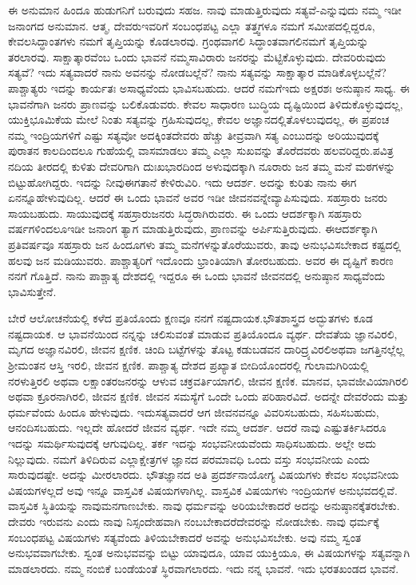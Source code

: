 ಈ ಅನುಮಾನ ಹಿಂದೂ ಹುಡುಗನಿಗೆ ಬರುವುದು ಸಹಜ. ನಾವು ಮಾಡುತ್ತಿರುವುದು ಸತ್ಯವೆ-ಎನ್ನುವುದು ನಮ್ಮ ಇಡೀ ಜನಾಂಗದ ಅನುಮಾನ. ಆತ್ಮ, ದೇವರು\break ಇವರಿಗೆ ಸಂಬಂಧಪಟ್ಟ ಎಲ್ಲಾ ತತ್ತ್ವಗಳೂ ನಮಗೆ ಸಮೀಪದಲ್ಲಿದ್ದರೂ, ಕೇವಲ\break ಸಿದ್ಧಾಂತಗಳು ನಮಗೆ ತೃಪ್ತಿಯನ್ನು ಕೊಡಲಾರವು. ಗ್ರಂಥವಾಗಲಿ ಸಿದ್ಧಾಂತವಾಗಲಿ\break ನಮಗೆ ತೃಪ್ತಿಯನ್ನು ತರಲಾರವು. ಸಾಕ್ಷಾತ್ಕಾರವೆಂಬ ಒಂದು ಭಾವನೆ ನಮ್ಮ\break ಸಾವಿರಾರು ಜನರನ್ನು ಮೆಟ್ಟಿಕೊಳ್ಳುವುದು. ದೇವರಿರುವುದು ಸತ್ಯವೆ? ಇದು ಸತ್ಯವಾದರೆ ನಾನು ಅವನನ್ನು ನೋಡಬಲ್ಲೆನೆ? ನಾನು ಸತ್ಯವನ್ನು ಸಾಕ್ಷಾತ್ಕಾರ ಮಾಡಿಕೊಳ್ಳಬಲ್ಲೆನೆ? ಪಾಶ್ಚಾತ್ಯರು ಇದನ್ನು ಕಾರ್ಯತಃ ಅಸಾಧ್ಯವೆಂದು ಭಾವಿಸಬಹುದು. ಆದರೆ ನಮಗೆ\break ಇದು ಅಕ್ಷರಶಃ ಅನುಷ್ಠಾನ ಸಾಧ್ಯ. ಈ ಭಾವನೆಗಾಗಿ ಜನರು ಪ್ರಾಣವನ್ನು ಬಲಿಕೊಡುವರು. ಕೇವಲ ಸಾಧಾರಣ ಬುದ್ಧಿಯ ದೃಷ್ಟಿಯಿಂದ ತಿಳಿದುಕೊಳ್ಳುವುದಲ್ಲ, ಯುಕ್ತಿ\break ಭೂಮಿಕೆಯ ಮೇಲೆ ನಿಂತು ಸತ್ಯವನ್ನು ಗ್ರಹಿಸುವುದಲ್ಲ, ಕೇವಲ ಅಜ್ಞಾನದಲ್ಲಿ\break ತೊಳಲುವುದಲ್ಲ, ಈ ಪ್ರಪಂಚ ನಮ್ಮ ಇಂದ್ರಿಯಗಳಿಗೆ ಎಷ್ಟು ಸತ್ಯವೋ ಅದಕ್ಕಿಂತ\break ದೇವರು ಹೆಚ್ಚು ತೀವ್ರವಾಗಿ ಸತ್ಯ ಎಂಬುದನ್ನು ಅರಿಯುವುದಕ್ಕೆ ಪುರಾತನ ಕಾಲದಿಂದಲೂ ಗುಹೆಯಲ್ಲಿ ವಾಸಮಾಡಲು ತಮ್ಮ ಎಲ್ಲಾ ಸುಖವನ್ನು ತೊರೆದವರು ಹಲವರಿದ್ದರು.\break ಪವಿತ್ರ ನದಿಯ ತೀರದಲ್ಲಿ ಕುಳಿತು ದೇವರಿಗಾಗಿ ದುಃಖಭಾರದಿಂದ ಅಳುವುದಕ್ಕಾಗಿ ನೂರಾರು ಜನ ತಮ್ಮ ಮನೆ ಮಠಗಳನ್ನು ಬಿಟ್ಟುಹೋಗಿದ್ದರು. ಇದನ್ನು ನೀವು\break ಈಗತಾನೆ ಕೇಳಿರುವಿರಿ. ಇದು ಆದರ್ಶ. ಅದನ್ನು ಕುರಿತು ನಾನು ಈಗ ಏನನ್ನೂ\break ಹೇಳುವುದಿಲ್ಲ. ಆದರೆ ಈ ಒಂದು ಭಾವನೆ ಅವರ ಇಡೀ ಜೀವನವನ್ನೇ\break ವ್ಯಾಪಿಸುವುದು. ಸಹಸ್ರಾರು ಜನರು ಸಾಯಬಹುದು. ಸಾಯುವುದಕ್ಕೆ ಸಹಸ್ರಾರು\break ಜನರು ಸಿದ್ಧರಾಗಿರುವರು. ಈ ಒಂದು ಆದರ್ಶಕ್ಕಾಗಿ ಸಹಸ್ರಾರು ವರ್ಷಗಳಿಂದಲೂ\break ಇಡೀ ಜನಾಂಗ ತ್ಯಾಗ ಮಾಡುತ್ತಿರುವುದು, ಪ್ರಾಣವನ್ನು ಅರ್ಪಿಸುತ್ತಿರುವುದು. ಈ\break ಆದರ್ಶಕ್ಕಾಗಿ ಪ್ರತಿವರ್ಷವೂ ಸಹಸ್ರಾರು ಜನ ಹಿಂದೂಗಳು ತಮ್ಮ ಮನೆಗಳನ್ನು\break ತೊರೆಯುವರು, ತಾವು ಅನುಭವಿಸಬೇಕಾದ ಕಷ್ಟದಲ್ಲಿ ಹಲವು ಜನ ಮಡಿಯುವರು. ಪಾಶ್ಚಾತ್ಯರಿಗೆ ಇದೊಂದು ಭ್ರಾಂತಿಯಾಗಿ ತೋರಬಹುದು. ಅವರ ಈ ದೃಷ್ಟಿಗೆ ಕಾರಣ ನನಗೆ ಗೊತ್ತಿದೆ. ನಾನು ಪಾಶ್ಚಾತ್ಯ ದೇಶದಲ್ಲಿ ಇದ್ದರೂ ಈ ಒಂದು ಭಾವನೆ ಜೀವನದಲ್ಲಿ ಅನುಷ್ಠಾನ ಸಾಧ್ಯವೆಂದು ಭಾವಿಸುತ್ತೇನೆ.

ಬೇರೆ ಆಲೋಚನೆಯಲ್ಲಿ ಕಳೆದ ಪ್ರತಿಯೊಂದು ಕ್ಷಣವೂ ನನಗೆ ನಷ್ಟದಾಯಕ.\break ಭೌತಶಾಸ್ತ್ರದ ಅದ್ಭುತಗಳು ಕೂಡ ನಷ್ಟದಾಯಕ. ಆ ಭಾವನೆಯಿಂದ ನನ್ನನ್ನು ಚಲಿಸುವಂತೆ ಮಾಡುವ ಪ್ರತಿಯೊಂದೂ ವ್ಯರ್ಥ. ದೇವತೆಯ ಜ್ಞಾನವಿರಲಿ, ಮೃಗದ ಅಜ್ಞಾನವಿರಲಿ, ಜೀವನ ಕ್ಷಣಿಕ. ಚಿಂದಿ ಬಟ್ಟೆಗಳನ್ನು ತೊಟ್ಟ ಕಡುಬಡವನ ದಾರಿದ್ರ್ಯವಿರಲಿ\break ಅಥವಾ ಜಗತ್ತಿನಲ್ಲೆಲ್ಲ ಶ‍್ರೀಮಂತನ ಆಸ್ತಿ ಇರಲಿ, ಜೀವನ ಕ್ಷಣಿಕ. ಪಾಶ್ಚಾತ್ಯ ದೇಶದ ಪ್ರಖ್ಯಾತ ಬೀದಿಯೊಂದರಲ್ಲಿ ಗುಲಾಮಗಿರಿಯಲ್ಲಿ ನರಳುತ್ತಿರಲಿ ಅಥವಾ ಲಕ್ಷಾಂತರ\break ಜನರನ್ನು ಆಳುವ ಚಕ್ರವರ್ತಿಯಾಗಲಿ, ಜೀವನ ಕ್ಷಣಿಕ. ಮಾನವ, ಭಾವಜೀವಿ\-ಯಾಗಿರಲಿ ಅಥವಾ ಕ್ರೂರನಾಗಿರಲಿ, ಜೀವನ ಕ್ಷಣಿಕ. ಜೀವನ ಸಮಸ್ಯೆಗೆ ಒಂದೇ ಒಂದು ಪರಿಹಾರವಿದೆ. ಅದನ್ನೇ ದೇವರೆಂದು ಮತ್ತು ಧರ್ಮವೆಂದು ಹಿಂದೂ ಹೇಳುವುದು. ಇದು\break ಸತ್ಯವಾದರೆ ಆಗ ಜೀವನವನ್ನೂ ವಿವರಿಸಬಹುದು, ಸಹಿಸಬಹುದು, ಆನಂದಿಸಬಹುದು. ಇಲ್ಲದೇ ಹೋದರೆ ಜೀವನ ವ್ಯರ್ಥ. ಇದೇ ನಮ್ಮ ಆದರ್ಶ. ಆದರೆ ನಾವು ಎಷ್ಟು\break ತರ್ಕಿಸಿದರೂ ಇದನ್ನು ಸಮರ್ಥಿಸುವುದಕ್ಕೆ ಆಗುವುದಿಲ್ಲ. ತರ್ಕ ಇದನ್ನು ಸಂಭವನೀಯವೆಂದು ಸಾಧಿಸಬಹುದು. ಅಲ್ಲೇ ಅದು ನಿಲ್ಲುವುದು. ನಮಗೆ ತಿಳಿದಿರುವ ಎಲ್ಲಾ\break ಕ್ಷೇತ್ರಗಳ ಜ್ಞಾನದ ಪರಮಾವಧಿ ಒಂದು ವಸ್ತು ಸಂಭವನೀಯ ಎಂದು ಸಾರುವುದಷ್ಟೇ. ಅದನ್ನು ಮೀರಲಾರದು. ಭೌತಜ್ಞಾನದ ಅತಿ ಪ್ರದರ್ಶನಾಯೋಗ್ಯ ವಿಷಯಗಳು ಕೇವಲ ಸಂಭವನೀಯ ವಿಷಯಗಳಲ್ಲದೆ ಅವು ಇನ್ನೂ ವಾಸ್ತವಿಕ ವಿಷಯಗಳಾಗಿಲ್ಲ. ವಾಸ್ತವಿಕ ವಿಷಯಗಳು ಇಂದ್ರಿಯಗಳ ಅನುಭವದಲ್ಲಿವೆ. ವಾಸ್ತವಿಕ ಸ್ಥಿತಿಯನ್ನು ನಾವು\break ಮನಗಾಣಬೇಕು. ನಾವು ಧರ್ಮವನ್ನು ಅರಿಯಬೇಕಾದರೆ ಅದನ್ನು ಅನುಷ್ಠಾನಕ್ಕೆ\break ತರಬೇಕು. ದೇವರು ಇರುವನು ಎಂದು ನಾವು ನಿಸ್ಸಂದೇಹವಾಗಿ ನಂಬಬೇಕಾದರೆ\break ದೇವರನ್ನು ನೋಡಬೇಕು. ನಾವು ಧರ್ಮಕ್ಕೆ ಸಂಬಂಧಪಟ್ಟ ವಿಷಯಗಳು ಸತ್ಯವೆಂದು ತಿಳಿಯಬೇಕಾದರೆ ಅವನ್ನು ಅನುಭವಿಸಬೇಕು. ಅವು ನಮ್ಮ ಸ್ವಂತ ಅನುಭವವಾಗಬೇಕು. ಸ್ವಂತ ಅನುಭವವನ್ನು ಬಿಟ್ಟು ಯಾವುದೂ, ಯಾವ ಯುಕ್ತಿಯೂ, ಈ ವಿಷಯಗಳನ್ನು ಸತ್ಯವನ್ನಾಗಿ ಮಾಡಲಾರದು. ನಮ್ಮ ನಂಬಿಕೆ ಬಂಡೆಯಂತೆ ಸ್ಥಿರವಾಗಲಾರದು. ಇದು ನನ್ನ ಭಾವನೆ. ಇದು ಭರತಖಂಡದ ಭಾವನೆ.

